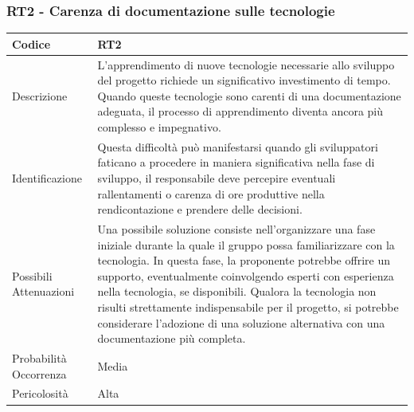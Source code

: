 \documentclass[10pt]{article}
\begin{document}
{    \subsubsection{RT2 - Carenza di documentazione sulle tecnologie}
    \label{RT2}
    \begin{tabularx}{\textwidth}{|l|X|}
    \hline
    Codice & RT2 \\
    \hline
    Descrizione & L'apprendimento di nuove tecnologie necessarie allo sviluppo del progetto richiede un significativo investimento di tempo. Quando queste tecnologie sono carenti di una documentazione adeguata, il processo di apprendimento diventa ancora più complesso e impegnativo.\\
    \hline
    Identificazione & Questa difficoltà può manifestarsi quando gli sviluppatori faticano a procedere in maniera significativa nella fase di sviluppo, il responsabile deve percepire eventuali rallentamenti o carenza di ore produttive nella rendicontazione e prendere delle decisioni.  \\
    \hline
    Possibili Attenuazioni & Una possibile soluzione consiste nell'organizzare una fase iniziale durante la quale il gruppo possa familiarizzare con la tecnologia. In questa fase, la proponente potrebbe offrire un supporto, eventualmente coinvolgendo esperti con esperienza nella tecnologia, se disponibili. Qualora la tecnologia non risulti strettamente indispensabile per il progetto, si potrebbe considerare l'adozione di una soluzione alternativa con una documentazione più completa.\\
    \hline
    Probabilità Occorrenza & Media \\
    \hline
    Pericolosità & Alta \\ 
    \hline
    \end{tabularx}

}
\end{document}
